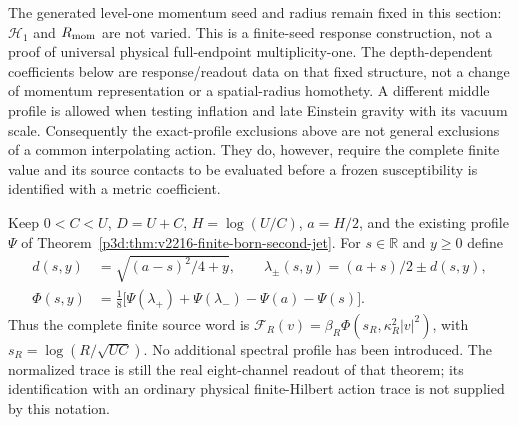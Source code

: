 \documentclass[12pt,a4paper]{article}
\begin{document}
The generated level-one momentum seed and radius remain fixed in
this section: $\mathcal H_1$ and $R_{\rm mom}$ are not varied.
This is a finite-seed response construction, not a proof of universal
physical full-endpoint multiplicity-one.  The depth-dependent coefficients below are response/readout data
on that fixed structure, not a change of momentum representation or a
spatial-radius homothety.  A different middle profile is allowed when
testing inflation and late Einstein gravity with its vacuum scale.
Consequently the exact-profile exclusions above are not general
exclusions of a common interpolating action.  They do, however, require
the complete finite value and its source contacts to be evaluated before
a frozen susceptibility is identified with a metric coefficient.

\begin{definition}
\label{p3d:def:v2218-finite-orbit-value}
Keep $0<C<U$, $D=U+C$, $H=\log(U/C)$, $a=H/2$, and the existing
profile $\Psi$ of Theorem~\ref{p3d:thm:v2216-finite-born-second-jet}.
For $s\in\mathbb R$ and $y\ge0$ define
\begin{align}
 d(s,y)&=\sqrt{(a-s)^2/4+y},\qquad
 \lambda_\pm(s,y)=(a+s)/2\pm d(s,y),\nonumber\\
 \Phi(s,y)&=\frac18\bigl[
 \Psi(\lambda_+)+\Psi(\lambda_-)-\Psi(a)-\Psi(s)\bigr].
 \label{p3d:eq:v2218-finite-orbit-value}
\end{align}
Thus the complete finite source word is
$\mathcal F_R(v)=\beta_R\Phi(s_R,\kappa_R^2|v|^2)$, with
$s_R=\log(R/\sqrt{UC})$.  No additional spectral profile has been
introduced.  The normalized trace is still the real eight-channel
readout of that theorem; its identification with an ordinary physical
finite-Hilbert action trace is not supplied by this notation.
\end{definition}
\end{document}
